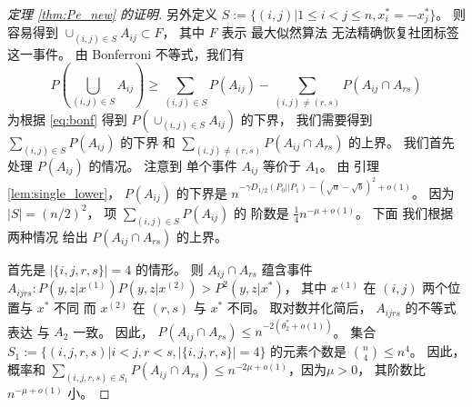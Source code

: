 \begin{proof}[定理 \ref{thm:Pe_new} 的证明]
另外定义 $S:=\{(i,j)| 1\leq i < j\leq n,
x_i^*=-x_j^*
\}$。
则容易得到 $\cup_{(i,j) \in S} A_{ij} \subset F$，
其中 $F$ 表示 最大似然算法 无法精确恢复社团标签
这一事件。
由 Bonferroni 不等式，我们有
\begin{equation}\label{eq:bonf}
	P\left(\bigcup_{(i,j)\in S} A_{ij} \right) \geq
	\sum_{(i,j)\in S} P(A_{ij})
	- \sum_{(i,j) \neq (r,s)} P(A_{ij} \cap A_{rs})		
\end{equation}
为根据 \eqref{eq:bonf}
得到
$P(\cup_{(i,j)\in S} A_{ij})$
的下界，
我们需要得到 $\sum_{(i,j)\in S} P(A_{ij})$
的下界 和
$\sum_{(i,j) \neq (r,s)} P(A_{ij} \cap A_{rs})$
的上界。
我们首先 处理 $P(A_{ij})$ 的情况。
注意到 单个事件 $A_{ij}$
等价于 $A_1$。
由 引理 \ref{lem:single_lower}，
$P(A_{ij})$ 的下界是
$n^{-\gamma D_{1/2}(P_0 || P_1)-\left(\sqrt{a} - \sqrt{b}\right)^2 +o(1)}$。
因为
$|S|=(n/2)^2$，
项 $\sum_{(i,j) \in S} P(A_{ij})$ 的 阶数是 
$\frac{1}{4}n^{-\mu+o(1)}$。
下面 我们根据两种情况 给出 $P(A_{ij} \cap A_{rs})$ 的上界。

首先是  $|\{i,j,r,s\}|=4$
的情形。 则 $A_{ij} \cap A_{rs}$ 蕴含事件
$A_{ijrs}: P(y,z|x^{(1)})P(y,z|x^{(2)}) > P^2(y,z|x^*)$，
其中 $x^{(1)}$ 在 $(i,j)$ 两个位置与 $x^*$ 不同
而 $x^{(2)}$ 在 $(r,s)$ 与 $x^*$
不同。
取对数并化简后，
$A_{ijrs}$ 的不等式表达
与 $A_2$ 一致。
因此， $P(A_{ij} \cap A_{rs}) \leq n^{-2(\theta^*_2 + o(1))} $。
集合 $S_1:=\{(i,j,r,s)| i<j, r<s, |\{i,j,r,s\}|=4\}$
的元素个数是 $\binom{n}{4} \leq n^4$。
因此，概率和
$\sum_{(i,j,r,s) \in S_1} P(A_{ij} \cap A_{rs})
\leq n^{-2\mu +o(1)}$，因为$\mu > 0$，
其阶数比 $n^{-\mu+o(1)}$ 小。


\end{proof}
